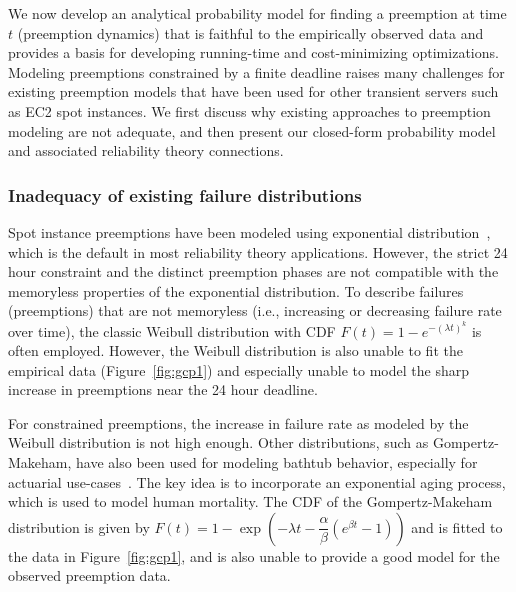 We now develop an analytical probability model for finding a preemption at time $t$ (preemption dynamics) that is faithful to the empirically observed data and provides a basis for developing running-time and cost-minimizing optimizations. %
%
% 
Modeling preemptions constrained by a finite deadline raises many challenges for existing preemption models that have been used for other transient servers such as EC2 spot instances.
%
We first discuss why existing approaches to preemption modeling are not adequate, and then present our closed-form probability model and associated reliability theory connections. 


\vspace*{\subsecspace}
\subsubsection{Inadequacy of existing failure distributions}

Spot instance preemptions have been modeled using exponential distribution~\cite{bid-cloud, hotcloud-not-bid, flint}, which is the default in most reliability theory applications. 
However, the strict 24 hour constraint and the distinct preemption phases are not compatible with the memoryless properties of the exponential distribution. 
%
To describe failures (preemptions) that are not memoryless (i.e., increasing or decreasing failure rate over time), the classic Weibull distribution with CDF $F(t)=1-e^{-(\lambda t)^k}$ is often employed. However, the Weibull distribution is also unable to fit the empirical data (Figure~\ref{fig:gcp1}) and especially unable to model the sharp increase in preemptions near the 24 hour deadline. 

For constrained preemptions, the increase in failure rate as modeled by the Weibull distribution is not high enough.
Other distributions, such as Gompertz-Makeham, have also been used for modeling bathtub behavior, especially  for actuarial use-cases~\cite{missov2013gompertz}. 
The key idea is to incorporate an exponential aging process, which is used to model human mortality.
The CDF of the Gompertz-Makeham distribution is given by $F(t) = 1 - \exp\left(-\lambda t - \dfrac{\alpha}{\beta}(e^{\beta t} - 1) \right)$
and is fitted to the data in Figure~\ref{fig:gcp1}, and is also unable to provide a good model for the observed preemption data.
%


